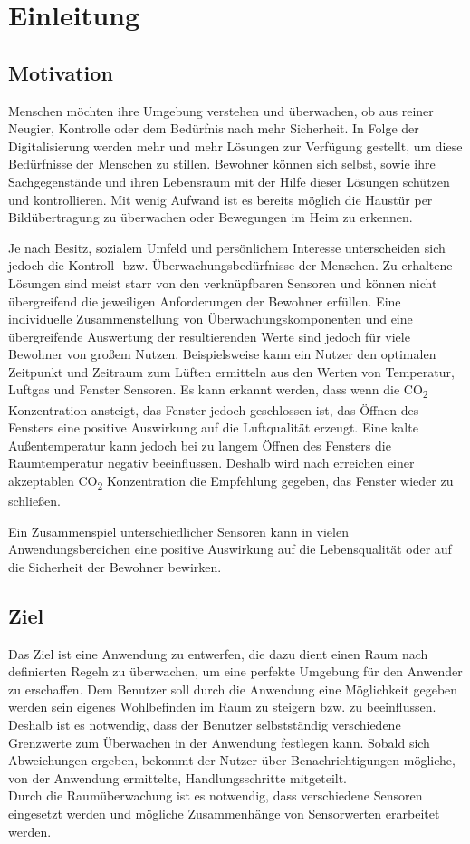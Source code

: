 \chapter{Einleitung}

\section{Motivation}
Menschen möchten ihre Umgebung verstehen und überwachen, ob aus reiner Neugier, Kontrolle oder dem Bedürfnis nach mehr Sicherheit.
In Folge der Digitalisierung werden mehr und mehr Lösungen zur Verfügung gestellt, um diese Bedürfnisse der Menschen zu stillen. Bewohner können sich selbst, sowie ihre Sachgegenstände und ihren Lebensraum mit der Hilfe dieser Lösungen schützen und kontrollieren. Mit wenig Aufwand ist es bereits möglich die Haustür per Bildübertragung zu überwachen oder Bewegungen im Heim zu erkennen.

Je nach Besitz, sozialem Umfeld und persönlichem Interesse unterscheiden sich jedoch die Kontroll- bzw. Überwachungsbedürfnisse der Menschen. Zu erhaltene Lösungen sind meist starr von den verknüpfbaren Sensoren und können nicht übergreifend die jeweiligen Anforderungen der Bewohner erfüllen.
Eine individuelle Zusammenstellung von Überwachungskomponenten und eine übergreifende Auswertung der resultierenden Werte sind jedoch für viele Bewohner von großem Nutzen. Beispielsweise kann ein Nutzer den optimalen Zeitpunkt und Zeitraum zum Lüften ermitteln aus den Werten von Temperatur, Luftgas und Fenster Sensoren. Es kann erkannt werden, dass wenn die CO\textsubscript{2} Konzentration ansteigt, das Fenster jedoch geschlossen ist, das Öffnen des Fensters eine positive Auswirkung auf die Luftqualität erzeugt. Eine kalte Außentemperatur kann jedoch bei zu langem Öffnen des Fensters die Raumtemperatur negativ beeinflussen. Deshalb wird nach erreichen einer akzeptablen CO\textsubscript{2} Konzentration die Empfehlung gegeben, das Fenster wieder zu schließen.

Ein Zusammenspiel unterschiedlicher Sensoren kann in vielen Anwendungsbereichen eine positive Auswirkung auf die Lebensqualität oder auf die Sicherheit der Bewohner bewirken.

\section{Ziel}
Das Ziel ist eine Anwendung zu entwerfen, die dazu dient einen Raum nach definierten Regeln zu überwachen, um eine perfekte Umgebung für den Anwender zu erschaffen. Dem Benutzer soll durch die Anwendung eine Möglichkeit gegeben werden sein eigenes Wohlbefinden im Raum zu steigern bzw. zu beeinflussen. \\Deshalb ist es notwendig, dass der Benutzer selbstständig verschiedene Grenzwerte zum Überwachen in der Anwendung festlegen kann. Sobald sich Abweichungen ergeben, bekommt der Nutzer über Benachrichtigungen mögliche, von der Anwendung ermittelte, Handlungsschritte mitgeteilt.\\
Durch die Raumüberwachung ist es notwendig, dass verschiedene Sensoren eingesetzt werden und mögliche Zusammenhänge von Sensorwerten erarbeitet werden.

